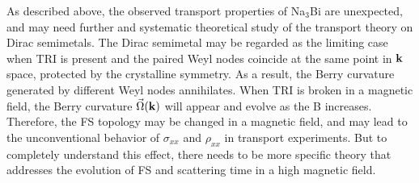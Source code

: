 As described above, the observed transport properties of Na$_3$Bi are unexpected, and may need further and systematic theoretical study of the transport theory on Dirac semimetals. The Dirac semimetal may be regarded as the limiting case when TRI is present and the paired Weyl nodes coincide at the same point in $\bf k$ space, protected by the crystalline symmetry. As a result, the Berry curvature generated by different Weyl nodes annihilates. When TRI is broken in a magnetic field, the Berry curvature $\vec{\Omega}(\bf k)$ will appear and evolve as the B increases. Therefore, the FS topology may be changed in a magnetic field, and may lead to the unconventional behavior of  $\sigma_{xx}$ and $\rho_{xx}$ in transport experiments. But to completely understand this effect, there needs to be more specific theory that addresses the evolution of FS and scattering time in a high magnetic field.